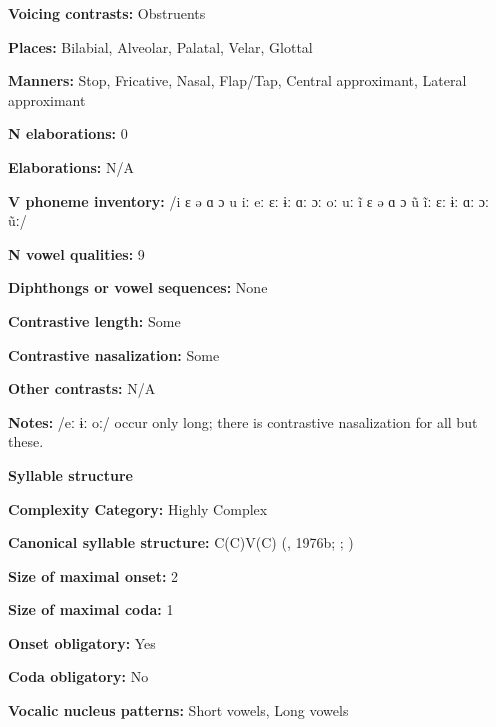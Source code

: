 \textbf{Voicing contrasts:} Obstruents



\textbf{Places:} Bilabial, Alveolar, Palatal, Velar, Glottal



\textbf{Manners:} Stop, Fricative, Nasal, Flap/Tap, Central approximant, Lateral approximant



\textbf{N elaborations:} 0



\textbf{Elaborations:} N/A



\textbf{V phoneme inventory:} /i ɛ ə ɑ ɔ u iː eː ɛː ɨː ɑː ɔː oː uː ĩ ɛ ə ɑ ɔ ũ ĩː ɛː ɨː ɑː ɔː ũː/



\textbf{N vowel qualities:} 9



\textbf{Diphthongs or vowel sequences:} None



\textbf{Contrastive length:} Some



\textbf{Contrastive nasalization:} Some



\textbf{Other contrasts:} N/A



\textbf{Notes:} /eː ɨː oː/ occur only long; there is contrastive nasalization for all but these.



\textbf{Syllable structure}



\textbf{Complexity Category:} Highly Complex 



\textbf{Canonical syllable structure:} C(C)V(C) (\citealt{Diffloth1976a}, 1976b; \citealt{Sloan1988}; \citealt{Philips2007})



\textbf{Size of maximal onset:} 2



\textbf{Size of maximal coda:} 1



\textbf{Onset obligatory:} Yes



\textbf{Coda obligatory:} No



\textbf{Vocalic nucleus patterns:} Short vowels, Long vowels



